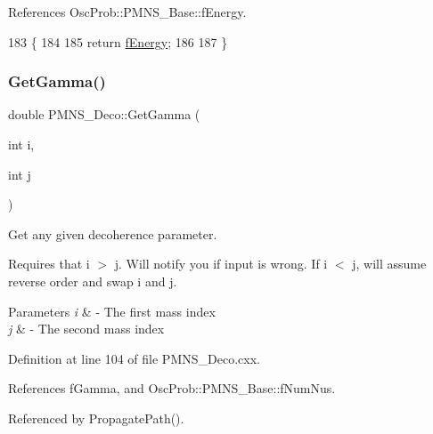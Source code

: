 References Osc\+Prob\+::\+P\+M\+N\+S\+\_\+\+Base\+::f\+Energy.


\begin{DoxyCode}
183                             \{
184 
185   \textcolor{keywordflow}{return} \hyperlink{classOscProb_1_1PMNS__Base_a2800af6d436972f3e900867790c046b0}{fEnergy};
186 
187 \}
\end{DoxyCode}
\mbox{\label{classOscProb_1_1PMNS__Deco_a73461e806063588a8e3a9d5d0dd201cb}} 
\subsubsection{\texorpdfstring{Get\+Gamma()}{GetGamma()}}
{\footnotesize\ttfamily double P\+M\+N\+S\+\_\+\+Deco\+::\+Get\+Gamma (\begin{DoxyParamCaption}\item[{int}]{i,  }\item[{int}]{j }\end{DoxyParamCaption})\hspace{0.3cm}{\ttfamily [virtual]}}

Get any given decoherence parameter.

Requires that i $>$ j. Will notify you if input is wrong. If i $<$ j, will assume reverse order and swap i and j.


\begin{DoxyParams}{Parameters}
{\em i} & -\/ The first mass index \\
\hline
{\em j} & -\/ The second mass index \\
\hline
\end{DoxyParams}


Definition at line 104 of file P\+M\+N\+S\+\_\+\+Deco.\+cxx.



References f\+Gamma, and Osc\+Prob\+::\+P\+M\+N\+S\+\_\+\+Base\+::f\+Num\+Nus.



Referenced by Propagate\+Path().


